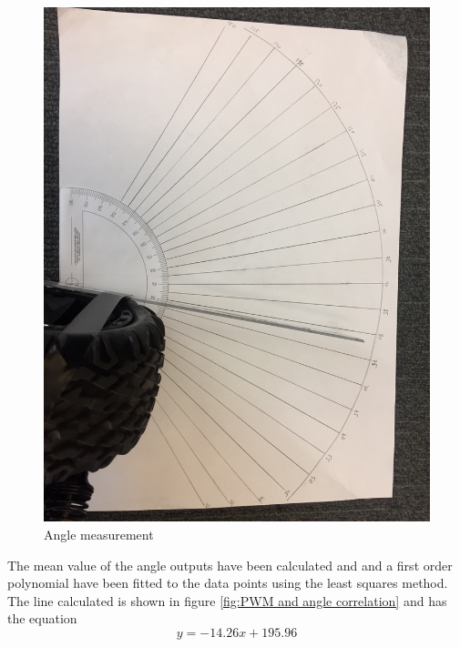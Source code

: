 \begin{figure}[H]
  \includegraphics[width=\textwidth]{./img/anglepic.JPG}
  \centering
  \caption{Angle measurement}
  \label{fig:Angle measurement}
\end{figure}


The mean value of the angle outputs have been calculated and and a first order polynomial have been fitted to the data points using the least squares method. The line calculated is shown in figure  \ref{fig:PWM and angle correlation} and has the equation $$ y=-14.26x + 195.96$$ 

